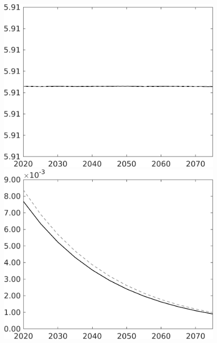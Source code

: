 \documentclass[12pt]{article}
\begin{document}
\begin{figure}[h!!]
\begin{minipage}[]{0.32\textwidth}
\end{minipage}	
\begin{minipage}[]{0.32\textwidth}
\includegraphics[width=1\textwidth]{../../codding_model/own_basedOnFried/optimalPol_010922_revision/figures/all_13Sept22/CompTaul_Equlab_LFBAU_Reg0_pgpftf_spillover0_nsk1_xgr1_knspil1_sep1_countec0_GovRev0_etaa0.79_lgd0.png}
\end{minipage}	
\begin{minipage}[]{0.32\textwidth}
\includegraphics[width=1\textwidth]{../../codding_model/own_basedOnFried/optimalPol_010922_revision/figures/all_13Sept22/CompTaul_Equlab_LFBAU_Reg0_Lf_spillover0_nsk1_xgr1_knspil1_sep1_countec0_GovRev0_etaa0.79_lgd0.png}

\end{minipage}
\end{figure}
\end{document}
